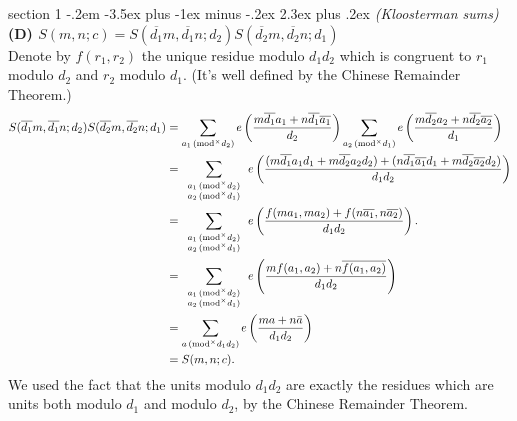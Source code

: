 \documentclass[12pt]{article}
\makeatletter
\theoremstyle{norm}
\newcommand{\pa}[1]{\left( {#1} \right)}
\newcommand{\subprob}[1]{\noindent\textbf{#1}\\}
\newcommand{\pf}[2]{\pa{\frac{#1}{#2}}}
\newcommand{\ol}[1]{\overline{#1}}
\newcommand{\mmod}[1]{\,(\text{mod}^{\times} #1)}
\newenvironment{problem}{\@startsection
       {section}
       {1}
       {-.2em}
       {-3.5ex plus -1ex minus -.2ex}
       {2.3ex plus .2ex}
       {\pagebreak[3]%
       \large\bf\noindent{Problem }
       }
       }
       {%
       }
\makeatother
\begin{document}
\begin{problem}{\it (Kloosterman sums)}
\subprob{(D) $S(m,n;c)=S(\ol{d_1}m,\ol{d_1}n;d_2)S(\ol{d_2}m,\ol{d_2}n;{d_1})$}
Denote by $f(r_1,r_2)$ the unique residue modulo $d_1d_2$ which is congruent to $r_1$ modulo $d_2$ and $r_2$ modulo $d_1$. (It's well defined by the Chinese Remainder Theorem.)
\begin{align*}
S(\ol{d_1}m,\ol{d_1}n;d_2)S(\ol{d_2}m,\ol{d_2}n;{d_1})
&=\sum_{a_1\mmod{d_2}}e\pf{m\ol{d_1}a_1+n\ol{d_1}\ol{a_1}}{d_2} 
\sum_{a_2\mmod{d_1}}e\pf{m\ol{d_2}a_2+n\ol{d_2}\ol{a_2}}{d_1}\\
&=
\sum_{\scriptsize\begin{array}{c}a_1\mmod{d_2}\\a_2\mmod{d_1} \end{array}}
e\pf{
(m\ol{d_1}a_1d_1+m\ol{d_2}a_2d_2)+
(n\ol{d_1}\ol{a_1}d_1+m\ol{d_2}\ol{a_2}d_2)
}
{d_1d_2}\\
&=\sum_{\scriptsize\begin{array}{c}a_1\mmod{d_2}\\a_2\mmod{d_1} \end{array}}
e\pf{f(ma_1,ma_2)+f(n\ol{a_1},n\ol{a_2})}
{d_1d_2}.\\
&=\sum_{\scriptsize\begin{array}{c}a_1\mmod{d_2}\\a_2\mmod{d_1} \end{array}}
e\pf{mf(a_1,a_2)+n\ol{f(a_1,a_2)}}
{d_1d_2}\\
&=\sum_{a\mmod{d_1d_2}} e\pf{ma+n\bar{a}}{d_1d_2}\\
&=S(m,n;c).
\end{align*}
We used the fact that the units modulo $d_1d_2$ are exactly the residues which are units both modulo $d_1$ and modulo $d_2$, by the Chinese Remainder Theorem.
\end{problem}
\end{document}

